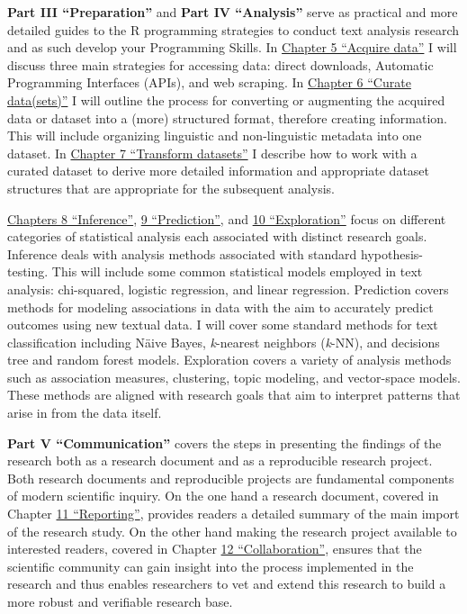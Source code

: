 \documentclass[
  letterpaper,
]{latex/krantz}
\begin{document}
\textbf{Part III ``Preparation''} and \textbf{Part IV ``Analysis''}
serve as practical and more detailed guides to the R programming
strategies to conduct text analysis research and as such develop your
Programming Skills. In \protect\hyperlink{acquire-data-chapter}{Chapter
5 ``Acquire data''} I will discuss three main strategies for accessing
data: direct downloads, Automatic Programming Interfaces (APIs), and web
scraping. In \protect\hyperlink{curate-datasets-chapter}{Chapter 6
``Curate data(sets)''} I will outline the process for converting or
augmenting the acquired data or dataset into a (more) structured format,
therefore creating information. This will include organizing linguistic
and non-linguistic metadata into one dataset. In
\protect\hyperlink{transform-datasets-chapter}{Chapter 7 ``Transform
datasets''} I describe how to work with a curated dataset to derive more
detailed information and appropriate dataset structures that are
appropriate for the subsequent analysis.

\protect\hyperlink{inference-chapter}{Chapters 8 ``Inference''},
\protect\hyperlink{prediction-chapter}{9 ``Prediction''}, and
\protect\hyperlink{exploration-chapter}{10 ``Exploration''} focus on
different categories of statistical analysis each associated with
distinct research goals. Inference deals with analysis methods
associated with standard hypothesis-testing. This will include some
common statistical models employed in text analysis: chi-squared,
logistic regression, and linear regression. Prediction covers methods
for modeling associations in data with the aim to accurately predict
outcomes using new textual data. I will cover some standard methods for
text classification including Näive Bayes, \emph{k}-nearest neighbors
(\emph{k}-NN), and decisions tree and random forest models. Exploration
covers a variety of analysis methods such as association measures,
clustering, topic modeling, and vector-space models. These methods are
aligned with research goals that aim to interpret patterns that arise in
from the data itself.

\textbf{Part V ``Communication''} covers the steps in presenting the
findings of the research both as a research document and as a
reproducible research project. Both research documents and reproducible
projects are fundamental components of modern scientific inquiry. On the
one hand a research document, covered in Chapter
\protect\hyperlink{reporting-chapter}{11 ``Reporting''}, provides
readers a detailed summary of the main import of the research study. On
the other hand making the research project available to interested
readers, covered in Chapter \protect\hyperlink{collaboration-chapter}{12
``Collaboration''}, ensures that the scientific community can gain
insight into the process implemented in the research and thus enables
researchers to vet and extend this research to build a more robust and
verifiable research base.
\end{document}
